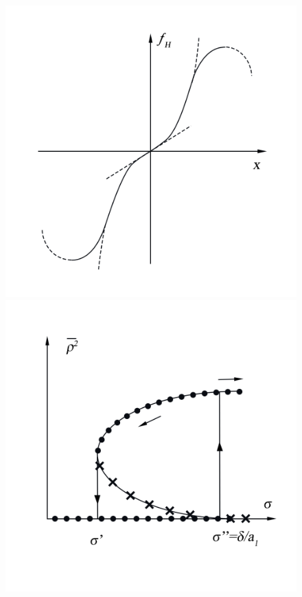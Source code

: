 \begin{figure}[h!]
    \vspace{-20pt}
    \centering
    \begin{minipage}{0.49\linewidth}
    \includegraphics[width=\linewidth]{photo/pics/Ris8.png}
    \caption{}
    \label{fig:8a}
    \end{minipage}
    \begin{minipage}{0.49\linewidth}
    \includegraphics[width=\linewidth]{photo/pics/Ris9.png}
    \caption{}
    \label{fig:9}
    \end{minipage}
\end{figure}
